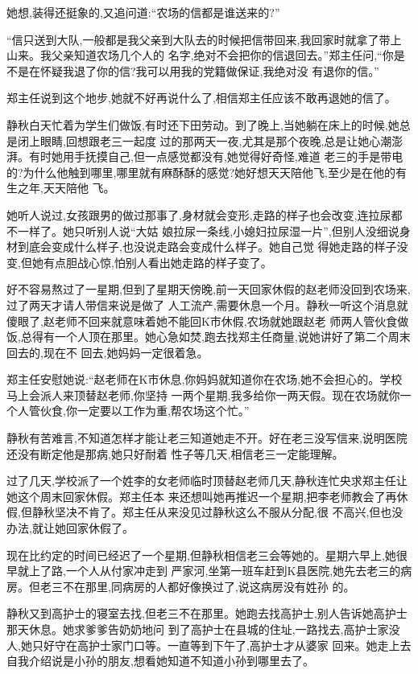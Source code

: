 ﻿\documentclass[12pt]{article}
\begin{document}
她想,装得还挺象的,又追问道:``农场的信都是谁送来的?''

``信只送到大队,一般都是我父亲到大队去的时候把信带回来,我回家时就拿了带上山来。我父亲知道农场几个人的
名字,绝对不会把你的信退回去。''郑主任问,``你是不是在怀疑我退了你的信?我可以用我的党籍做保证,我绝对没
有退你的信。''

郑主任说到这个地步,她就不好再说什么了,相信郑主任应该不敢再退她的信了。

静秋白天忙着为学生们做饭,有时还下田劳动。到了晚上,当她躺在床上的时候,她总是闭上眼睛,回想跟老三一起度
过的那两天一夜,尤其是那个夜晚,总是让她心潮澎湃。有时她用手抚摸自己,但一点感觉都没有,她觉得好奇怪,难道
老三的手是带电的?为什么他触到哪里,哪里就有麻酥酥的感觉?她好想天天陪他飞,至少是在他的有生之年,天天陪他
飞。

她听人说过,女孩跟男的做过那事了,身材就会变形,走路的样子也会改变,连拉尿都不一样了。她只听别人说``大姑
娘拉尿一条线,小媳妇拉尿湿一片'',但别人没细说身材到底会变成什么样子,也没说走路会变成什么样子。她自己觉
得她走路的样子没变,但她有点胆战心惊,怕别人看出她走路的样子变了。

好不容易熬过了一星期,但到了星期天傍晚,前一天回家休假的赵老师没回到农场来,过了两天才请人带信来说是做了
人工流产,需要休息一个月。静秋一听这个消息就傻眼了,赵老师不回来就意味着她不能回K市休假,农场就她跟赵老
师两人管伙食做饭,总得有一个人顶在那里。她心急如焚,跑去找郑主任商量,说她讲好了第二个周末回去的,现在不
回去,她妈妈一定很着急。

郑主任安慰她说:``赵老师在K市休息,你妈妈就知道你在农场,她不会担心的。学校马上会派人来顶替赵老师,你坚持
一两个星期,我多给你一两天假。现在农场就你一个人管伙食,你一定要以工作为重,帮农场这个忙。''

静秋有苦难言,不知道怎样才能让老三知道她走不开。好在老三没写信来,说明医院还没有断定他是那病,她只好耐着
性子等几天,相信老三一定能理解。

过了几天,学校派了一个姓李的女老师临时顶替赵老师几天,静秋连忙央求郑主任让她这个周末回家休假。郑主任本
来还想叫她再推迟一个星期,把李老师教会了再休假,但静秋坚决不肯了。郑主任从来没见过静秋这么不服从分配,很
不高兴,但也没办法,就让她回家休假了。

现在比约定的时间已经迟了一个星期,但静秋相信老三会等她的。星期六早上,她很早就上了路,一个人从付家冲走到
严家河,坐第一班车赶到K县医院,她先去老三的病房。但老三不在那里,同病房的人都好像换过了,说这病房没有姓孙
的。

静秋又到高护士的寝室去找,但老三不在那里。她跑去找高护士,别人告诉她高护士那天休息。她求爹爹告奶奶地问
到了高护士在县城的住址,一路找去,高护士家没人,她只好守在高护士家门口等。一直等到下午了,高护士才从婆家
回来。她走上去自我介绍说是小孙的朋友,想看她知道不知道小孙到哪里去了。
\end{document}
